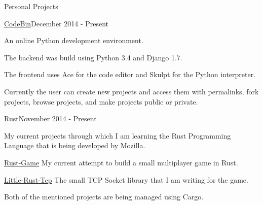 \documentclass{resume} %
\begin{document}
\begin{rSection}{Personal Projects}

\begin{rSubsection}{\href{https://github.com/DylanTheVillain/CodeBin}{CodeBin}}{December 2014 - Present}{}{}

	\item An online Python development environment.
	\item The backend was build using Python 3.4 and Django 1.7.
	\item The frontend uses Ace for the code editor and Skulpt for the Python interpreter.
	\item Currently the user can create new projects and access them with permalinks, fork projects, browse projects, and make projects public or private.
\end{rSubsection}

\begin{rSubsection}{Rust}{November 2014 - Present}{}{}
	\item My current projects through which I am learning the Rust Programming Language that is being developed by Mozilla.
	\item {\href{https://github.com/DylanTheVillain/Rust-Game}{Rust-Game}} My current attempt to build a small multiplayer game in Rust.
	\item {\href{https://github.com/DylanTheVillain/Little-Rust-Tcp}{Little-Rust-Tcp}} The small TCP Socket library that I am writing for the game.
	\item Both of the mentioned projects are being managed using Cargo.
\end{rSubsection}

\end{rSection}

\end{document}
